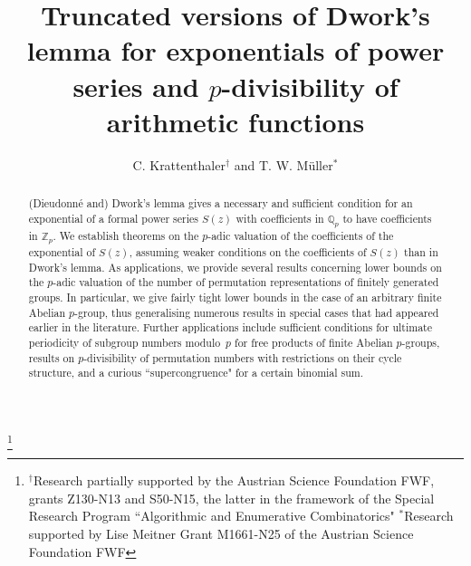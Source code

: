 \documentclass[12pt,reqno]{amsart}
\numberwithin{equation}{section}
\theoremstyle{remark}
\begin{document}
\title[Truncations of Dwork's lemma]{Truncated versions of Dwork's lemma for exponentials
of power series and $p$-divisibility of arithmetic functions}

\author[C. Krattenthaler and 
T.\,W. M\"uller]{C. Krattenthaler$^{\dagger}$ and
T. W. M\"uller$^*$} 

\address{$^{\dagger}$Fakult\"at f\"ur Mathematik, Universit\"at Wien, 
Oskar-Morgenstern-Platz~1, A-1090 Vienna, Austria.
WWW: {\tt http://www.mat.univie.ac.at/\lower0.5ex\hbox{\~{}}kratt}.}

\address{$^*$School of Mathematical Sciences, Queen Mary \& Westfield College, 
University of London,
Mile End Road, London E1 4NS, United Kingdom.}

\thanks{$^\dagger$Research partially supported by the Austrian
Science Foundation FWF, grants Z130-N13 and S50-N15,
the latter in the framework of the Special Research Program
``Algorithmic and Enumerative Combinatorics"\newline\indent
$^*$Research supported by Lise Meitner Grant M1661-N25 of the Austrian
Science Foundation FWF}

\subjclass[2010]{}


\begin{abstract}
(Dieudonn\'e and) Dwork's lemma gives a necessary and sufficient
condition for an exponential of a formal power series $S(z)$ with
coefficients in $\mathbb Q_p$ to have coefficients in $\mathbb Z_p$. 
We establish theorems on the $p$-adic valuation of the coefficients
of the exponential of $S(z)$, assuming weaker conditions on the
coefficients of $S(z)$ than in Dwork's lemma. As applications,
we provide several results concerning lower bounds on the
$p$-adic valuation of the number of permutation representations
of finitely generated groups. In particular, we give fairly tight
lower bounds in the case of an arbitrary finite Abelian $p$-group,
thus generalising numerous results in special cases that had appeared
earlier in the literature. Further applications include sufficient
conditions for ultimate periodicity of subgroup numbers modulo~$p$
for free products of finite Abelian $p$-groups, results on
$p$-divisibility of permutation numbers with restrictions on their
cycle structure, and a curious
``supercongruence" for a certain binomial sum.  
\end{abstract}
\end{document}
